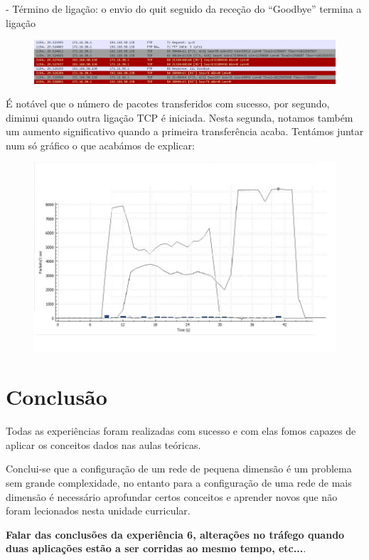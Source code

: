 \documentclass[a4paper]{article}
\begin{document}
- Término de ligação: o envio do quit seguido da receção do “Goodbye” termina a ligação 

\begin{figure}[!ht]
\centering
\includegraphics[scale=0.35]{quit_tcp.jpg}
\end{figure}

É notável que o número de pacotes transferidos com sucesso, por segundo, diminui quando outra ligação TCP é iniciada. Nesta segunda, notamos também um aumento significativo quando a primeira transferência acaba. Tentámos juntar num só gráfico o que acabámos de explicar: 

\begin{figure}[!ht]
\centering
\includegraphics[scale=0.35]{tuxexp6.jpg}
\end{figure}

\section{Conclusão}

Todas as experiências foram realizadas com sucesso e com elas fomos capazes de aplicar os conceitos dados nas aulas teóricas. 

Conclui-se que a configuração de um rede de pequena dimensão é um problema sem grande complexidade, no entanto para a configuração de uma rede de mais dimensão é necessário aprofundar certos conceitos e aprender novos que não foram lecionados nesta unidade curricular.

\textbf{Falar das conclusões da experiência 6, alterações no tráfego quando duas aplicações estão a ser corridas ao mesmo tempo, etc...}.
\end{document}
